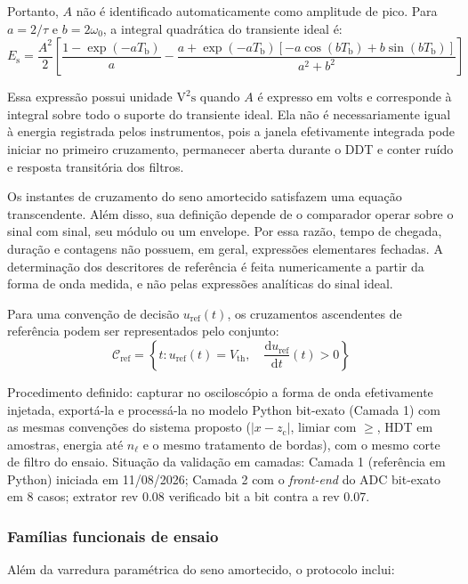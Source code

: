 Portanto, \(A\) não é identificado automaticamente como amplitude de pico. Para \(a=2/\tau\) e \(b=2\omega_0\), a integral quadrática do transiente ideal é:
\begin{equation}
	E_{\mathrm{s}} = \frac{A^2}{2} \left[\frac{1-\exp\left(-aT_{\mathrm{b}}\right)}{a}-\frac{a+\exp\left(-aT_{\mathrm{b}}\right) \left[-a\cos\left(bT_{\mathrm{b}}\right)+ b\sin\left(bT_{\mathrm{b}}\right)
		\right]}{a^2+b^2}\right]
	\label{v2:eq:energia_seno_amortecido}
\end{equation}

Essa expressão possui unidade \(\mathrm{V^2s}\) quando \(A\) é expresso em volts e corresponde à integral sobre todo o suporte do transiente ideal. Ela não é necessariamente igual à energia registrada pelos instrumentos, pois a janela efetivamente integrada pode iniciar no primeiro cruzamento, permanecer aberta durante o DDT e conter ruído e resposta transitória dos filtros.

Os instantes de cruzamento do seno amortecido satisfazem uma equação transcendente. Além disso, sua definição depende de o comparador operar sobre o sinal com sinal, seu módulo ou um envelope. Por essa razão, tempo de chegada, duração e contagens não possuem, em geral, expressões elementares fechadas. A determinação dos descritores de referência é feita numericamente a partir da forma de onda medida, e não pelas expressões analíticas do sinal ideal.

Para uma convenção de decisão \(u_{\mathrm{ref}}(t)\), os cruzamentos ascendentes de referência podem ser representados pelo conjunto:
\begin{equation}
	\mathcal{C}_{\mathrm{ref}} = \left\{t: u_{\mathrm{ref}}(t)=V_{\mathrm{th}}, \quad \frac{\mathrm{d}u_{\mathrm{ref}}}{\mathrm{d}t}(t)>0 \right\}
	\label{v2:eq:cruzamentos_referencia_continuos}
\end{equation}

 Procedimento definido: capturar no osciloscópio a forma de onda efetivamente injetada, exportá-la e processá-la no modelo Python bit-exato (Camada 1) com as mesmas convenções do sistema proposto (\(|x - z_{\mathrm{c}}|\), limiar com \(\ge\), HDT em amostras, energia até \(n_\ell\) e o mesmo tratamento de bordas), com o mesmo corte de filtro do ensaio. Situação da validação em camadas: Camada 1 (referência em Python) iniciada em 11/08/2026; Camada 2 com o \textit{front-end} do ADC bit-exato em 8 casos; extrator rev 0.08 verificado bit a bit contra a rev 0.07.

\subsubsection{Famílias funcionais de ensaio}
Além da varredura paramétrica do seno amortecido, o protocolo inclui:

